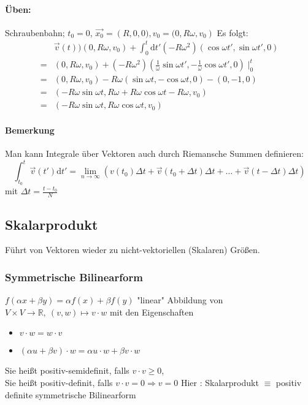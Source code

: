 \documentclass[a4paper]{scrartcl}
\theoremstyle{definition}
\theoremstyle{plain}
\theoremstyle{remark}
\begin{document}
\paragraph{Üben:}
\label{sec-2-5-1-2}
Schraubenbahn; $t_0 = 0$, $\vec{x_0} = \left(R, 0, 0), v_0 = (0, R\omega, v_0\right)$
Es folgt:
\begin{align*}
&\vec{v}(t) ) (0, R\omega, v_0) + \int_0^t \mathrm{d}t' ( -R\omega^2)(\cos{\omega t', \sin{\omega t'}, 0})\\
=& (0, R\omega, v_0) + (-R\omega^2)(\frac{1}{\omega}\sin{\omega t'}, -\frac{1}{\omega}\cos{\omega t'}, 0)\mid_0^t\\
=& (0, R\omega, v_0) - R\omega (\sin{\omega t}, -\cos{\omega t}, 0) - (0, -1, 0)\\
=& (-R\omega\sin{\omega t}, R\omega + R\omega\cos{\omega t} - R\omega, v_0)\\
=& (-R\omega\sin{\omega t}, R\omega\cos{\omega t}, v_0)
\end{align*}
\paragraph{Bemerkung}
\label{sec-2-5-1-3}
Man kann Integrale über Vektoren auch durch Riemansche Summen definieren:
\[\int_{t_0}^t \vec{v}(t')\mathrm{d}t' = \lim_{n\to\infty} (v(t_0)\Delta t + \vec{v}(t_0 + \Delta t)\Delta t + \ldots + \vec{v}(t - \Delta t)\Delta t)\]
mit $\Delta t = \frac{t - t_0}{N}$
\subsection{Skalarprodukt}
\label{sec-2-6}
Führt von Vektoren wieder zu nicht-vektoriellen (Skalaren) Größen.
\subsubsection{Symmetrische Bilinearform}
\label{sec-2-6-1}
$f(\alpha x + \beta y) = \alpha f(x) + \beta f(y)$ "linear"
Abbildung von $V\times V \to \mathbb{R},~(v,w) \mapsto v\cdot w$ mit den Eigenschaften
\begin{itemize}
\item $v\cdot w = w\cdot v$
\item $(\alpha u + \beta v) \cdot w = \alpha u\cdot w + \beta v\cdot w$
\end{itemize}
Sie heißt positiv-semidefinit, falls  $v\cdot v\geq 0$, \\
    Sie heißt positiv-definit, falls  $v\cdot v = 0 \Rightarrow v = 0$
Hier : Skalarprodukt $\equiv$ positiv definite symmetrische Bilinearform
\end{document}

